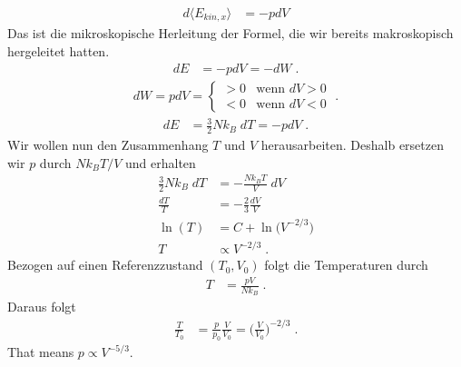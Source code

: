 \begin{align*}
d \langle E_{kin,x}\rangle
&= - p dV
\end{align*}
Das ist die mikroskopische Herleitung der Formel, die wir bereits makroskopisch hergeleitet hatten.
\begin{align*}
dE &= - pdV  = -dW\;.
\end{align*}
\begin{align*}
dW = pdV =
\begin{cases}
	> 0&\text{wenn } dV >0\\
		< 0&\text{wenn } dV <0
\end{cases}\;.
\end{align*}
\begin{align*}
dE &= \frac{3}{2} N k_{B}\;dT= - pdV\;.
\end{align*}
Wir wollen nun den Zusammenhang $T$ und $V$ herausarbeiten. Deshalb ersetzen wir $p$ durch
$N k_{B} T/V$ und erhalten
\begin{align*}
\frac{3}{2} N k_{B}\;dT&= - \frac{N k_{B} T}{V}
\;dV\\
\frac{dT}{T}&= - \frac{2}{3}\frac{ dV}{V}\\
\ln(T) &= C + \ln\big(V^{-2/3}\big)\\
T &\propto V^{-2/3}\;. 
\end{align*}
Bezogen auf einen Referenzzustand $(T_{0},V_{0})$ folgt
die Temperaturen durch
\begin{align*}
T &= \frac{p V}{N k_{B}}\;.
\end{align*}
Daraus folgt
\begin{align*}
\frac{T}{T_{0}} &= \frac{p }{p_{0}}\frac{V}{V_{0}} = \bigg(\frac{V}{V_{0}}\bigg)^{-2/3}\;.
\end{align*}
That means $p\propto V^{-5/3}$. 

